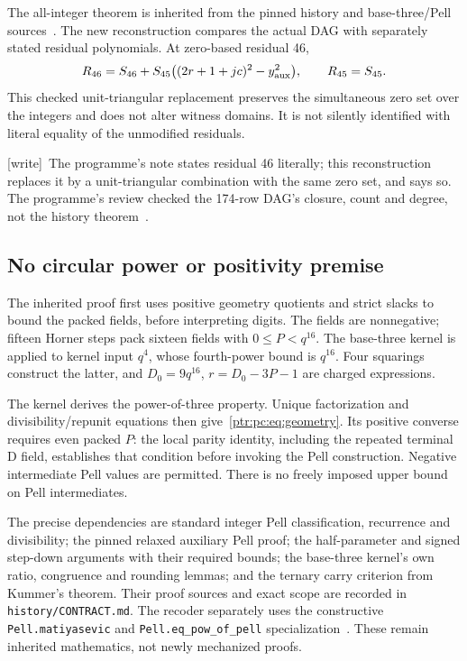 \documentclass[11pt,letterpaper]{article}
\theoremstyle{definition}\newtheorem{definition}[theorem]{Definition}
\theoremstyle{remark}\newtheorem{remark}[theorem]{Remark}
\newcommand{\codeu}[1]{\nolinkurl{#1}}
\newcommand{\wtag}{\textup{[write]}}
\begin{document}
The all-integer theorem is inherited from the pinned history and base-three/Pell sources~\cite{ptr:pc:history}. The new reconstruction compares the actual DAG with separately stated residual polynomials. At zero-based residual 46,
\[
 R_{46}=S_{46}+S_{45}\bigl((2r+1+jc)^2-y_{\rm aux}^2\bigr),
 \qquad R_{45}=S_{45}.
\]
This checked unit-triangular replacement preserves the simultaneous zero set over the integers and does not alter witness domains. It is not silently identified with literal equality of the unmodified residuals.

{\small\wtag\ The programme's note states residual 46 literally; this
reconstruction replaces it by a unit-triangular combination with the same
zero set, and says so. The programme's review checked the 174-row DAG's
closure, count and degree, not the history theorem~\cite{ptr:w:rev4048}.\par}

\subsection{No circular power or positivity premise}
The inherited proof first uses positive geometry quotients and strict slacks to bound the packed fields, before interpreting digits. The fields are nonnegative; fifteen Horner steps pack sixteen fields with $0\le P<q^{16}$. The base-three kernel is applied to kernel input $q^4$, whose fourth-power bound is $q^{16}$. Four squarings construct the latter, and $D_0=9q^{16}$, $r=D_0-3P-1$ are charged expressions.

The kernel derives the power-of-three property. Unique factorization and divisibility/repunit equations then give~\eqref{ptr:pc:eq:geometry}. Its positive converse requires even packed $P$: the local parity identity, including the repeated terminal D field, establishes that condition before invoking the Pell construction. Negative intermediate Pell values are permitted. There is no freely imposed upper bound on Pell intermediates.

The precise dependencies are standard integer Pell classification, recurrence and divisibility; the pinned relaxed auxiliary Pell proof; the half-parameter and signed step-down arguments with their required bounds; the base-three kernel's own ratio, congruence and rounding lemmas; and the ternary carry criterion from Kummer's theorem. Their proof sources and exact scope are recorded in \codeu{history/CONTRACT.md}. The recoder separately uses the constructive \codeu{Pell.matiyasevic} and \codeu{Pell.eq_pow_of_pell} specialization~\cite{ptr:pc:pell}. These remain inherited mathematics, not newly mechanized proofs.
\end{document}
